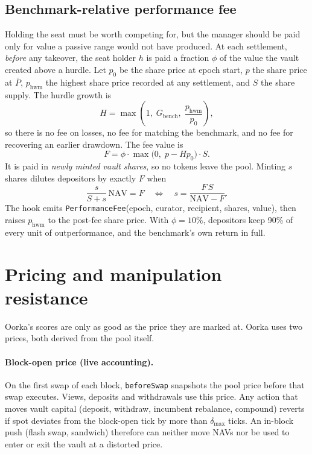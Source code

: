 \documentclass[11pt,a4paper]{article}
\newcommand{\code}[1]{\texttt{\small #1}}
\newcommand{\NAV}{\mathrm{NAV}}
\begin{document}
\subsection{Benchmark-relative performance fee}
Holding the seat must be worth competing for, but the manager should be paid only for value a passive range would not have produced. At each settlement, \emph{before} any takeover, the seat holder $h$ is paid a fraction $\phi$ of the value the vault created above a hurdle. Let $p_0$ be the share price at epoch start, $p$ the share price at $\bar P$, $p_{\text{hwm}}$ the highest share price recorded at any settlement, and $S$ the share supply. The hurdle growth is
\begin{equation}
  H = \max\!\left(1,\; G_{\text{bench}},\; \frac{p_{\text{hwm}}}{p_0}\right),
\end{equation}
so there is no fee on losses, no fee for matching the benchmark, and no fee for recovering an earlier drawdown. The fee value is
\begin{equation}
  F = \phi \cdot \max\big(0,\; p - H p_0\big)\cdot S .
\end{equation}
It is paid in \emph{newly minted vault shares}, so no tokens leave the pool. Minting $s$ shares dilutes depositors by exactly $F$ when
\begin{equation}
  \frac{s}{S + s}\,\NAV = F \quad\Longleftrightarrow\quad s = \frac{F\, S}{\NAV - F}.
\end{equation}
The hook emits \code{PerformanceFee}(epoch, curator, recipient, shares, value), then raises $p_{\text{hwm}}$ to the post-fee share price. With $\phi = 10\%$, depositors keep 90\% of every unit of outperformance, and the benchmark's own return in full.

\section{Pricing and manipulation resistance}\label{sec:pricing}
Oorka's scores are only as good as the price they are marked at. Oorka uses two prices, both derived from the pool itself.

\paragraph{Block-open price (live accounting).} On the first swap of each block, \code{beforeSwap} snapshots the pool price before that swap executes. Views, deposits and withdrawals use this price. Any action that moves vault capital (deposit, withdraw, incumbent rebalance, compound) reverts if spot deviates from the block-open tick by more than $\delta_{\max}$ ticks. An in-block push (flash swap, sandwich) therefore can neither move NAVs nor be used to enter or exit the vault at a distorted price.
\end{document}
